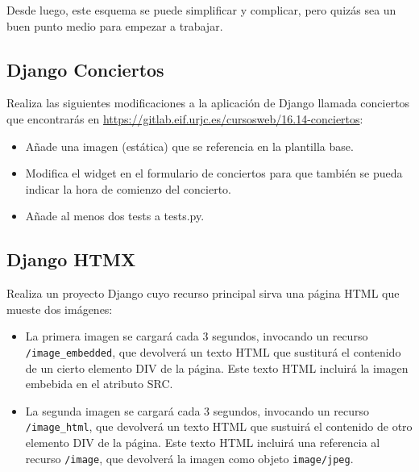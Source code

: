 Desde luego, este esquema se puede simplificar y complicar, pero quizás sea un buen punto medio para empezar a trabajar.

\subsection{Django Conciertos}
\label{subsec:django-conciertos}

Realiza las siguientes modificaciones a la aplicación de Django llamada conciertos que encontrarás en \url{https://gitlab.eif.urjc.es/cursosweb/16.14-conciertos}:

\begin{itemize}
  \item Añade una imagen (estática) que se referencia en la plantilla base.
  \item Modifica el widget en el formulario de conciertos para que también se pueda indicar la hora de comienzo del concierto.
  \item Añade al menos dos tests a tests.py.
\end{itemize}

\subsection{Django HTMX}
\label{subsec:django-htmx}

Realiza un proyecto Django cuyo recurso principal sirva una página HTML que mueste dos imágenes:

\begin{itemize}
\item La primera imagen se cargará cada 3 segundos, invocando un recurso \texttt{/image\_embedded}, que devolverá un texto HTML que sustiturá el contenido de un cierto elemento DIV de la página. Este texto HTML incluirá la imagen embebida en el atributo SRC.
\item La segunda imagen se cargará cada 3 segundos, invocando un recurso \texttt{/image\_html}, que devolverá un texto HTML que sustuirá el contenido de otro elemento DIV de la página. Este texto HTML incluirá una referencia al recurso \texttt{/image}, que devolverá la imagen como objeto \texttt{image/jpeg}.  
\end{itemize}

